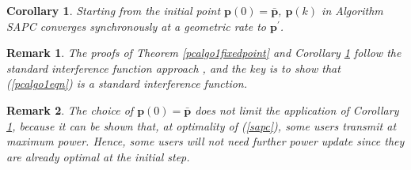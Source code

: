 \documentclass[10pt,twocolumn]{IEEEtran}
\newcommand{\0}{\mathbf{0}}
\newcommand{\1}{\mathbf{1}}
\newtheorem{corollary}{Corollary}
\newtheorem{remark}{Remark}
\begin{document}
\begin{corollary}
\label{pcalgo1fixedpointcorollary}
Starting from the initial point $\mathbf{p}(0)=\bar{\mathbf{p}}$, $\mathbf{p}(k)$ in Algorithm SAPC converges synchronously at a geometric rate to $\mathbf{p^{\prime}}$.
\end{corollary}

\begin{remark}
The proofs of Theorem \ref{pcalgo1fixedpoint} and Corollary \ref{pcalgo1fixedpointcorollary} follow the standard interference function approach \cite{Yates95}, and the key is to show that (\ref{pcalgo1eqn}) is a standard interference function.
\end{remark}

\begin{remark}
The choice of $\mathbf{p}(0)=\bar{\mathbf{p}}$ does not limit the application of Corollary \ref{pcalgo1fixedpointcorollary}, because it can be shown that, at optimality of (\ref{sapc}), some users transmit at maximum power. Hence, some users will not need further power update since they are already optimal at the initial step.
\end{remark}
\end{document}
